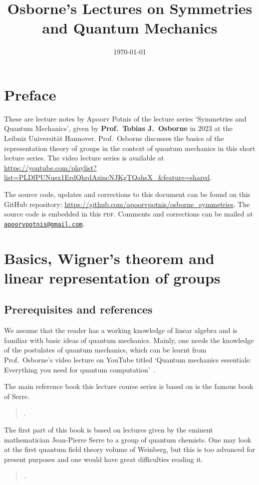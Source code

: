 \documentclass[a4 paper, 12pt]{book}
\title{Osborne's Lectures on Symmetries and Quantum Mechanics}
\author{}
\date{\today}
\theoremstyle{definition}
\begin{document}
	\hypertarget{TitlePage}{}
	\maketitle

	\chapter*{Preface}
	\hypertarget{Preface}{}
	These are lecture notes by Apoorv Potnis of the lecture series `Symmetries and Quantum Mechanics', given by \textbf{Prof.\ Tobias J.\ Osborne} in 2023 at the Leibniz Universität Hannover. Prof.\ Osborne discusses the basics of the representation theory of groups in the context of quantum mechanics in this short lecture series. The video lecture series is available at \url{https://youtube.com/playlist?list=PLDfPUNusx1ErdQhrdAzincNJKgTQahsX_&feature=shared}.

	The source code, updates and corrections to this document can be found on this GitHub repository: \url{https://github.com/apoorvpotnis/osborne_symmetries}. The source code is embedded in this \textsc{pdf}. Comments and corrections can be mailed at \href{mailto:apoorvpotnis@gmail.com}{\texttt{apoorvpotnis@gmail.com}}.
	\clearpage

	\hypertarget{Contents}{}
	\tableofcontents

	\chapter{Basics, Wigner's theorem and linear representation of groups}

	\section{Prerequisites and references}

	We assume that the reader has a working knowledge of linear algebra and is familiar with basic ideas of quantum mechanics. Mainly, one needs the knowledge of the postulates of quantum mechanics, which can be learnt from Prof.\ Osborne's video lecture on YouTube titled `Quantum mechanics essentials: Everything you need for quantum computation'~\cite{Osborne_quantum_essentials}.

	The main reference book this lecture course series is based on is the famous book of Serre.\begin{quote}.\end{quote}The first part of this book is based on lectures given by the eminent mathematician Jean-Pierre Serre to a group of quantum chemists. One may look at the first quantum field theory volume of Weinberg, but this is too advanced for present purposes and one would have great difficulties reading it.\begin{quote}.\end{quote}
\end{document}
